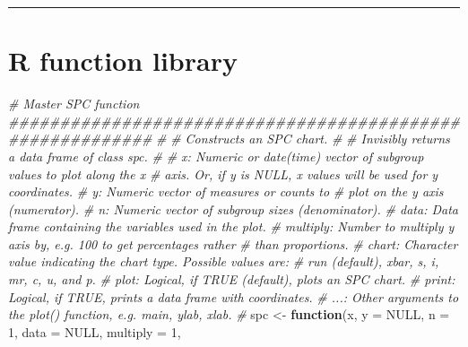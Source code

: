 \documentclass[
]{book}
\newenvironment{Shaded}{\begin{snugshade}}{\end{snugshade}}
\newcommand{\AttributeTok}[1]{\textcolor[rgb]{0.13,0.29,0.53}{#1}}
\newcommand{\CommentTok}[1]{\textcolor[rgb]{0.56,0.35,0.01}{\textit{#1}}}
\newcommand{\ConstantTok}[1]{\textcolor[rgb]{0.56,0.35,0.01}{#1}}
\newcommand{\ControlFlowTok}[1]{\textcolor[rgb]{0.13,0.29,0.53}{\textbf{#1}}}
\newcommand{\DecValTok}[1]{\textcolor[rgb]{0.00,0.00,0.81}{#1}}
\newcommand{\NormalTok}[1]{#1}
\newcommand{\OtherTok}[1]{\textcolor[rgb]{0.56,0.35,0.01}{#1}}
\begin{document}
\begin{center}\rule{0.5\linewidth}{0.5pt}\end{center}

\section*{R function library}\label{funs}

\begin{Shaded}
\begin{Highlighting}[]
\CommentTok{\# Master SPC function \#\#\#\#\#\#\#\#\#\#\#\#\#\#\#\#\#\#\#\#\#\#\#\#\#\#\#\#\#\#\#\#\#\#\#\#\#\#\#\#\#\#\#\#\#\#\#\#\#\#\#\#\#\#\#\#\#\#}
\CommentTok{\# }
\CommentTok{\# Constructs an SPC chart.}
\CommentTok{\# }
\CommentTok{\#  Invisibly returns a data frame of class \textquotesingle{}spc\textquotesingle{}.}
\CommentTok{\# }
\CommentTok{\#  x:        Numeric or date(time) vector of subgroup values to plot along the x}
\CommentTok{\#            axis. Or, if y is NULL, x values will be used for y coordinates.}
\CommentTok{\#  y:        Numeric vector of measures or counts to}
\CommentTok{\#            plot on the y axis (numerator).}
\CommentTok{\#  n:        Numeric vector of subgroup sizes (denominator).}
\CommentTok{\#  data:     Data frame containing the variables used in the plot.}
\CommentTok{\#  multiply: Number to multiply y axis by, e.g. 100 to get percentages rather }
\CommentTok{\#            than proportions.}
\CommentTok{\#  chart:    Character value indicating the chart type. Possible values are:}
\CommentTok{\#            \textquotesingle{}run\textquotesingle{} (default), \textquotesingle{}xbar\textquotesingle{}, \textquotesingle{}s\textquotesingle{}, \textquotesingle{}i\textquotesingle{}, \textquotesingle{}mr\textquotesingle{}, \textquotesingle{}c\textquotesingle{}, \textquotesingle{}u\textquotesingle{}, and \textquotesingle{}p\textquotesingle{}.}
\CommentTok{\#  plot:     Logical, if TRUE (default), plots an SPC chart.}
\CommentTok{\#  print:    Logical, if TRUE, prints a data frame with coordinates.}
\CommentTok{\#  ...:      Other arguments to the plot() function, e.g. main, ylab, xlab.}
\CommentTok{\# }
\NormalTok{spc }\OtherTok{\textless{}{-}} \ControlFlowTok{function}\NormalTok{(x,}
                \AttributeTok{y        =} \ConstantTok{NULL}\NormalTok{,}
                \AttributeTok{n        =} \DecValTok{1}\NormalTok{,}
                \AttributeTok{data     =} \ConstantTok{NULL}\NormalTok{,}
                \AttributeTok{multiply =} \DecValTok{1}\NormalTok{,}

\end{Highlighting}
\end{Shaded}
\end{document}
